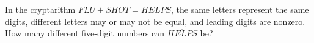 In the cryptarithm $\overline{FLU}+\overline{SHOT}=\overline{HELPS}$, the same letters represent the same digits, different letters may or may not be equal, and leading digits are nonzero. How many different five-digit numbers can $\overline{HELPS}$ be?
